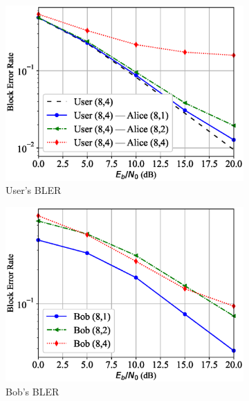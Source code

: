 \begin{figure}[tp!]
	\begin{subfigure}{0.28\textwidth}
		\includegraphics[width=\linewidth]{figs/covert_autoencoder_bler_rayleigh}
		\caption{User's BLER}
		\label{fig:rayleigh_resutls_ae}
	\end{subfigure}
	\hspace*{\fill}
	\begin{subfigure}{0.28\textwidth}
		\includegraphics[width=\linewidth]{figs/bob_bler_rayleigh}
		\caption{Bob's BLER}
		\label{fig:rayleigh_resutls_bob}	
	\end{subfigure}
	\hspace*{\fill}
	\begin{subfigure}{0.28\textwidth}

\end{subfigure}
\end{figure}
